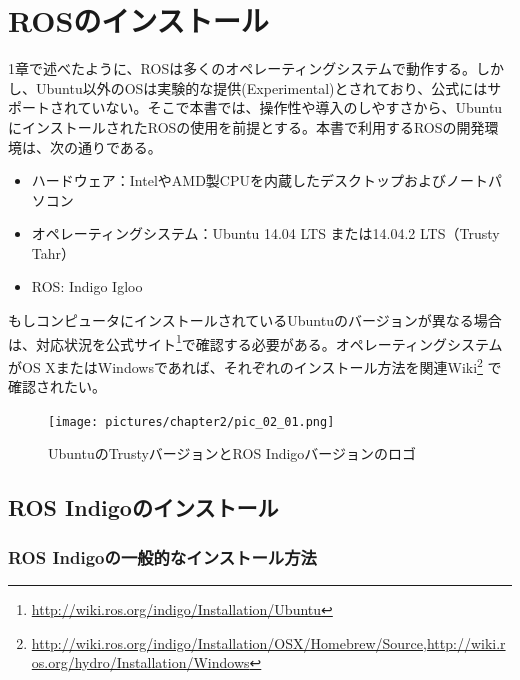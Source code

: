 
\chapter{ROSのインストール}

1章で述べたように、ROSは多くのオペレーティングシステムで動作する。しかし、Ubuntu以外のOSは実験的な提供(Experimental)とされており、公式にはサポートされていない。そこで本書では、操作性や導入のしやすさから、UbuntuにインストールされたROSの使用を前提とする。本書で利用するROSの開発環境は、次の通りである。
\\
\begin{itemize}
\item ハードウェア：IntelやAMD製CPUを内蔵したデスクトップおよびノートパソコン
\item オペレーティングシステム：Ubuntu 14.04 LTS または14.04.2 LTS（Trusty Tahr）
\item ROS: Indigo Igloo
\end{itemize}
\vspace{1\baselineskip}
もしコンピュータにインストールされているUbuntuのバージョンが異なる場合は、対応状況を公式サイト\footnote{\url{http://wiki.ros.org/indigo/Installation/Ubuntu}}で確認する必要がある。オペレーティングシステムがOS XまたはWindowsであれば、それぞれのインストール方法を関連Wiki\footnote{\url{http://wiki.ros.org/indigo/Installation/OSX/Homebrew/Source},\url{http://wiki.ros.org/hydro/Installation/Windows}} で確認されたい。

\begin{figure}[h]
  \centering
  \texttt{[image: pictures/chapter2/pic\_02\_01.png]}
  \caption{UbuntuのTrustyバージョンとROS Indigoバージョンのロゴ}
\end{figure}

\section{ROS Indigoのインストール}

\subsection{ROS Indigoの一般的なインストール方法}


